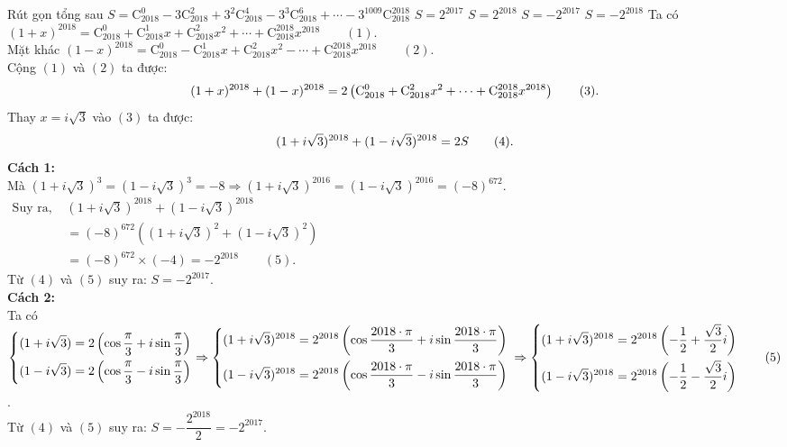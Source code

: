 \begin{ex}%
	Rút gọn tổng sau $S=\mathrm{C}_{2018}^0-3\mathrm{C}_{2018}^2+3^2\mathrm{C}_{2018}^4-3^3\mathrm{C}_{2018}^6+\dotsm-3^{1009}\mathrm{C}_{2018}^{2018}$
	\choice
	{$S=2^{2017}$}
	{$S=2^{2018}$}
	{\True $S=-2^{2017}$}
	{$S=-2^{2018}$}
	\loigiai
	{
		Ta có $(1+x)^{2018}=\mathrm{C}_{2018}^0+\mathrm{C}_{2018}^1x+\mathrm{C}_{2018}^2x^2+\dotsm+\mathrm{C}_{2018}^{2018}x^{2018}\qquad(1)$.\\
		Mặt khác $(1-x)^{2018}=\mathrm{C}_{2018}^0-\mathrm{C}_{2018}^1x+\mathrm{C}_{2018}^2x^2-\dotsm+\mathrm{C}_{2018}^{2018}x^{2018}\qquad(2)$.\\
		Cộng $(1)$ và $(2)$ ta được: 
		\vspace{-2ex}$$(1+x)^{2018}+(1-x)^{2018}=2\left(\mathrm{C}_{2018}^0+\mathrm{C}_{2018}^2x^2+\dotsm+\mathrm{C}_{2018}^{2018}x^{2018}\right)\qquad(3).\vspace{-2ex}$$
		Thay $x=i\sqrt{3}$ vào $(3)$ ta được:
		\vspace{-2ex}$$(1+i\sqrt{3})^{2018}+(1-i\sqrt{3})^{2018}=2S\qquad(4).\vspace{-2ex}$$
		\textbf{Cách 1:}\\
		Mà $(1+i\sqrt{3})^3=(1-i\sqrt{3})^3=-8\Rightarrow (1+i\sqrt{3})^{2016}=(1-i\sqrt{3})^{2016}=(-8)^{672}$.\\
		$\begin{aligned}
		\text{Suy ra, }&(1+i\sqrt{3})^{2018}+(1-i\sqrt{3})^{2018}\\
		&=(-8)^{672}\left((1+i\sqrt{3})^2+(1-i\sqrt{3})^2\right)\\
		&=(-8)^{672}\times(-4)=-2^{2018}\qquad(5).
		\end{aligned}$\\
		Từ $(4)$ và $(5)$ suy ra: $S=-2^{2017}$.\\
		\textbf{Cách 2:}\\
		Ta có $\left\{\begin{aligned}&(1+i\sqrt{3})=2\left(\cos \dfrac{\pi}{3}+i\sin \dfrac{\pi}{3}\right)\\&(1-i\sqrt{3})=2\left(\cos \dfrac{\pi}{3}-i\sin \dfrac{\pi}{3}\right)\end{aligned}\right.\Rightarrow\left\{\begin{aligned}&(1+i\sqrt{3})^{2018}=2^{2018}\left(\cos \dfrac{2018\cdot\pi}{3}+i\sin \dfrac{2018\cdot\pi}{3}\right)\\&(1-i\sqrt{3})^{2018}=2^{2018}\left(\cos \dfrac{2018\cdot\pi}{3}-i\sin \dfrac{2018\cdot\pi}{3}\right)\end{aligned}\right.\\
		\Rightarrow\left\{\begin{aligned}&(1+i\sqrt{3})^{2018}=2^{2018}\left(-\dfrac{1}{2}+\dfrac{\sqrt{3}}{2}i\right)\\&(1-i\sqrt{3})^{2018}=2^{2018}\left(-\dfrac{1}{2}-\dfrac{\sqrt{3}}{2}i\right)\end{aligned}\right.\qquad(5)$.\\
		Từ $(4)$ và $(5)$ suy ra: $S=-\dfrac{2^{2018}}{2}=-2^{2017}$.
	}
\end{ex}

